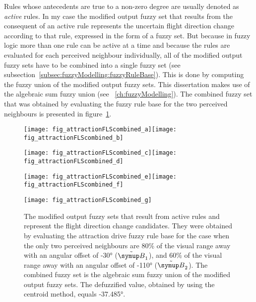 Rules whose antecedents are true to a non-zero degree are usually denoted as \emph{active} rules. In my case the modified output fuzzy set that results from the consequent of an active rule represents the uncertain flight direction change according to that rule, expressed in the form of a fuzzy set. But because in fuzzy logic more than one rule can be active at a time and because the rules are evaluated for each perceived neighbour individually, all of the modified output fuzzy sets have to be combined into a single fuzzy set (see subsection~\ref{subsec:fuzzyModelling:fuzzyRuleBase}). This is done by computing the fuzzy union of the modified output fuzzy sets. This dissertation makes use of the algebraic sum fuzzy union (see \chaptername~\ref{ch:fuzzyModelling}). The combined fuzzy set that was obtained by evaluating the fuzzy rule base for the two perceived neighbours is presented in figure~\ref{fig:attraction:FLS:combined}. 

\begin{figure}
	\null\vspace*{2mm}
	\texttt{[image: fig\_attractionFLScombined\_a]}\hspace*{2mm}\texttt{[image: fig\_attractionFLScombined\_b]}
	\par\vspace*{2mm}
	\texttt{[image: fig\_attractionFLScombined\_c]}\hspace*{2mm}\texttt{[image: fig\_attractionFLScombined\_d]}
	\par\vspace*{2mm}
	\texttt{[image: fig\_attractionFLScombined\_e]}\hspace*{2mm}\texttt{[image: fig\_attractionFLScombined\_f]}
	\par\vspace*{2mm}
	\texttt{[image: fig\_attractionFLScombined\_g]}
	\par\vspace*{2mm}
	\caption{The modified output fuzzy sets that result from active rules and represent the flight direction change candidates. They were obtained by evaluating the attraction drive fuzzy rule base for the case when the only two perceived neighbours are 80\% of the visual range away with an angular offset of \ang{-30} ($\fautom{B}_1$), and 60\% of the visual range away with an angular offset of \ang{-110} ($\fautom{B}_2$). The combined fuzzy set is the algebraic sum fuzzy union of the modified output fuzzy sets. The defuzzified value, obtained by using the centroid method, equals \ang{-37.485}.}
	\label{fig:attraction:FLS:combined}
\end{figure}

